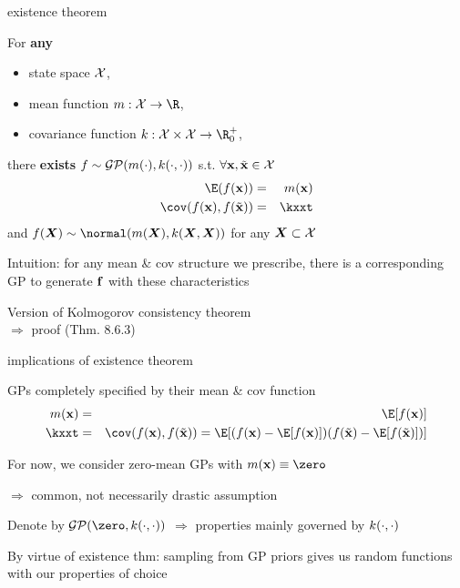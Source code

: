 \documentclass[11pt,compress,t,notes=noshow, xcolor=table]{beamer}
\begin{document}
\begin{framei}[sep=L]{existence theorem}
\item For \textbf{any} 
\begin{itemize}
\item state space $\mathcal{X}$,
\item mean function $m: \Xspace \rightarrow \R$,
\item covariance function $k: \Xspace \times \Xspace \rightarrow \R^+_0$, 
\end{itemize}
\vfill
there \textbf{exists} $f \sim \mathcal{GP}(m(\cdot), k(\cdot, \cdot))$ s.t. $\forall \mathbf{x}, \tilde{\mathbf{x}} \in \mathcal{X}$
\begin{eqnarray*}
\E(\fx) &=& m(\xv) \\
\cov(\fx, f(\xtil)) &=& \kxxt
\end{eqnarray*}
and $f(\bm{X}) \sim \normal(m(\bm{X}), k(\bm{X}, \bm{X}))$ for any $\bm{X} \subset \mathcal{X}$
\item Intuition: for any mean \& cov structure we prescribe, there is a corresponding GP to generate $\mathbf{f}$ with these characteristics
\item Version of Kolmogorov consistency theorem \\$\Rightarrow$ proof  (Thm. 8.6.3)
\end{framei}

\begin{framei}[sep=L]{implications of existence theorem}
\item GPs completely specified by their mean \& cov function
\begin{eqnarray*}
m(\xv) &=& \E[f(\xv)] \\
\kxxt &=& \cov(\fx, f(\xtil)) = \E [( f(\xv) - \E[f(\xv)]) ( f(\xtil) - \E[f(\xtil)] )]
\end{eqnarray*}
\item For now, we consider zero-mean GPs with $m(\xv) \equiv \zero$ 

$\Rightarrow$ common, not necessarily drastic assumption 
\item Denote by $\gpzk$ $\Rightarrow$ properties mainly governed by $k(\cdot, \cdot)$
\item By virtue of existence thm: sampling from GP priors gives us random functions with our properties of choice
\end{framei}
\end{document}
